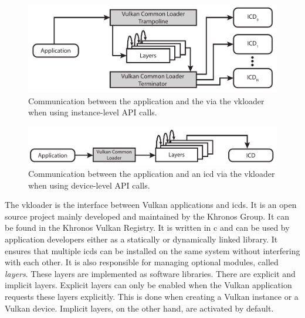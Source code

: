     \begin{figure}
      \includegraphics[width=\textwidth]{Main/Images/VulkanLoaderInstanceLayers}
      \centering
      \caption{Communication between the application and the  via the \gls{vkloader} when using instance-level API calls.}
      \label{fig:VulkanLoaderWithInstanceLayers}
    \end{figure}

    \begin{figure}
      \includegraphics[width=\textwidth]{Main/Images/VulkanLoaderDeviceLayers}
      \centering
      \caption{Communication between the application and an \acrfull{icd} via the \gls{vkloader} when using device-level API calls.}
      \label{fig:VulkanLoaderWithDeviceLayers}
    \end{figure}

    The \gls{vkloader} is the interface between Vulkan applications and \glspl{icd}.
    It is an open source project mainly developed and maintained by the Khronos Group.
    It can be found in the Khronos Vulkan Registry\cite{vulkanregistry}.
    It is written in \gls{c} and can be used by application developers either as a statically or dynamically linked library.
    It ensures that multiple \glspl{icd} can be installed on the same system without interfering with each other.
    It is also responsible for managing optional modules, called \textit{layers}.
    These layers are implemented as software libraries.
    There are explicit and implicit layers.
    Explicit layers can only be enabled when the Vulkan application requests these layers explicitly.
    This is done when creating a Vulkan instance or a Vulkan device.
    Implicit layers, on the other hand, are activated by default.

